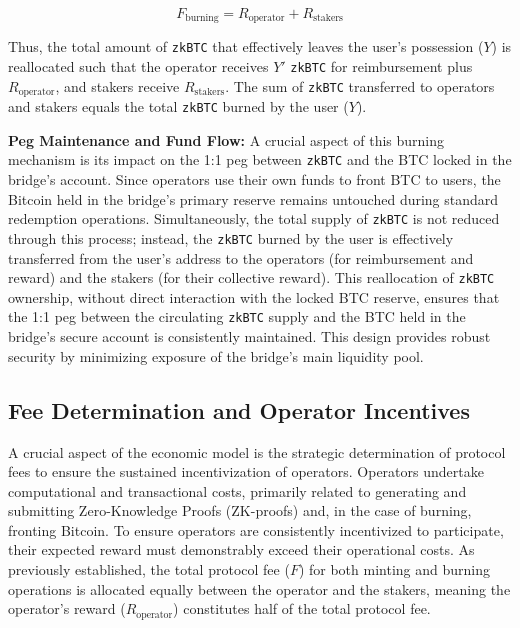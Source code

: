 \documentclass{DESSThesis}
\newcommand{\zktoken}{\texttt{zkBTC}}
\begin{document}
\begin{itemize}
\begin{equation} \label{eq:burning_reward}
    F_{\text{burning}} = R_{\text{operator}} + R_{\text{stakers}}
\end{equation}

    Thus, the total amount of \texttt{\zktoken} that effectively leaves the user's possession (\(Y\)) is reallocated such that the operator receives \(Y'\) \texttt{\zktoken} for reimbursement plus \(R_{\text{operator}}\), and stakers receive \(R_{\text{stakers}}\). The sum of \texttt{\zktoken} transferred to operators and stakers equals the total \texttt{\zktoken} burned by the user (\(Y\)).

    \textbf{Peg Maintenance and Fund Flow:} A crucial aspect of this burning mechanism is its impact on the 1:1 peg between \texttt{\zktoken} and the BTC locked in the bridge's account. Since operators use their own funds to front BTC to users, the Bitcoin held in the bridge's primary reserve remains untouched during standard redemption operations. Simultaneously, the total supply of \texttt{\zktoken} is not reduced through this process; instead, the \texttt{\zktoken} burned by the user is effectively transferred from the user's address to the operators (for reimbursement and reward) and the stakers (for their collective reward). This reallocation of \texttt{\zktoken} ownership, without direct interaction with the locked BTC reserve, ensures that the 1:1 peg between the circulating \texttt{\zktoken} supply and the BTC held in the bridge's secure account is consistently maintained. This design provides robust security by minimizing exposure of the bridge's main liquidity pool.
\end{itemize}


\subsection{Fee Determination and Operator Incentives} \label{subsec:fee_determination}
A crucial aspect of the economic model is the strategic determination of protocol fees to ensure the sustained incentivization of operators. Operators undertake computational and transactional costs, primarily related to generating and submitting Zero-Knowledge Proofs (ZK-proofs) and, in the case of burning, fronting Bitcoin. To ensure operators are consistently incentivized to participate, their expected reward must demonstrably exceed their operational costs. As previously established, the total protocol fee (\(F\)) for both minting and burning operations is allocated equally between the operator and the stakers, meaning the operator's reward (\(R_{\text{operator}}\)) constitutes half of the total protocol fee.
\end{document}
